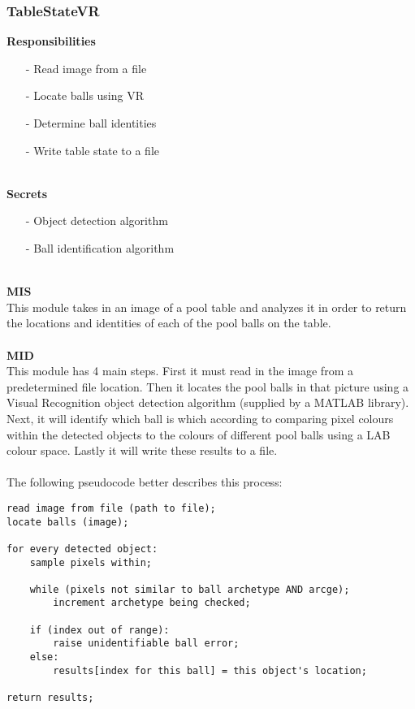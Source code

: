\documentclass[titlepage]{article}
\begin{document}
\subsubsection{TableStateVR}
\textbf{Responsibilities}
\begin{itemize}
	\item[-] Read image from a file
	\item[-] Locate balls using VR
	\item[-] Determine ball identities
	\item[-] Write table state to a file
\end{itemize}~\\
\textbf{Secrets}
\begin{itemize}
	\item[-] Object detection algorithm
	\item[-] Ball identification algorithm
\end{itemize}~\\
\textbf{MIS}\\[2mm]
This module takes in an image of a pool table and analyzes it in order to return the locations and identities of each of the pool balls on the table.
\\\\
\textbf{MID}\\[2mm]
This module has 4 main steps. First it must read in the image from a predetermined file location. Then it locates the pool balls in that picture using a Visual Recognition object detection algorithm (supplied by a MATLAB library). Next, it will identify which ball is which according to comparing pixel colours within the detected objects to the colours of different pool balls using a LAB colour space. Lastly it will write these results to a file.\\~\\
The following pseudocode better describes this process:
\begin{lstlisting}
read image from file (path to file);
locate balls (image);

for every detected object:
	sample pixels within;
	
	while (pixels not similar to ball archetype AND arcge);
		increment archetype being checked;
		
	if (index out of range):
		raise unidentifiable ball error;
	else:
		results[index for this ball] = this object's location;

return results;
\end{lstlisting}~\\
\end{document}
